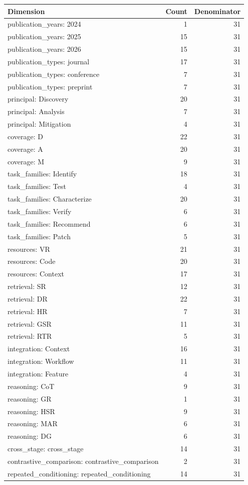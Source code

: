 \begin{tabular}{lrr}
\hline
Dimension & Count & Denominator \\
\hline
publication\_years: 2024 & 1 & 31 \\
publication\_years: 2025 & 15 & 31 \\
publication\_years: 2026 & 15 & 31 \\
publication\_types: journal & 17 & 31 \\
publication\_types: conference & 7 & 31 \\
publication\_types: preprint & 7 & 31 \\
principal: Discovery & 20 & 31 \\
principal: Analysis & 7 & 31 \\
principal: Mitigation & 4 & 31 \\
coverage: D & 22 & 31 \\
coverage: A & 20 & 31 \\
coverage: M & 9 & 31 \\
task\_families: Identify & 18 & 31 \\
task\_families: Test & 4 & 31 \\
task\_families: Characterize & 20 & 31 \\
task\_families: Verify & 6 & 31 \\
task\_families: Recommend & 6 & 31 \\
task\_families: Patch & 5 & 31 \\
resources: VR & 21 & 31 \\
resources: Code & 20 & 31 \\
resources: Context & 17 & 31 \\
retrieval: SR & 12 & 31 \\
retrieval: DR & 22 & 31 \\
retrieval: HR & 7 & 31 \\
retrieval: GSR & 11 & 31 \\
retrieval: RTR & 5 & 31 \\
integration: Context & 16 & 31 \\
integration: Workflow & 11 & 31 \\
integration: Feature & 4 & 31 \\
reasoning: CoT & 9 & 31 \\
reasoning: GR & 1 & 31 \\
reasoning: HSR & 9 & 31 \\
reasoning: MAR & 6 & 31 \\
reasoning: DG & 6 & 31 \\
cross\_stage: cross\_stage & 14 & 31 \\
contrastive\_comparison: contrastive\_comparison & 2 & 31 \\
repeated\_conditioning: repeated\_conditioning & 14 & 31 \\
\hline
\end{tabular}
